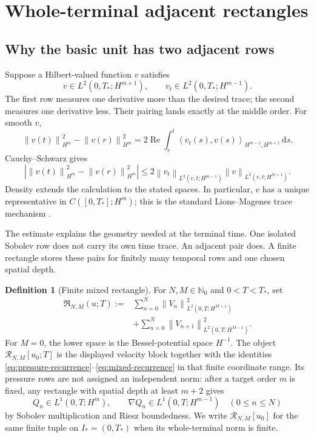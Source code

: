 \documentclass[11pt]{article}
\theoremstyle{definition}
\newtheorem{definition}[definition]{Definition}
\theoremstyle{remark}
\newcommand{\Nzero}{\mathbb N_0}
\newcommand{\cR}{\mathcal R}
\newcommand{\norm}[1]{\left\lVert #1\right\rVert}
\newcommand{\pair}[2]{\left\langle #1,#2\right\rangle}
\newcommand{\dd}{\,\mathrm d}
\begin{document}
\section{Whole-terminal adjacent rectangles}
\label{sec:rectangles}

\subsection{Why the basic unit has two adjacent rows}

Suppose a Hilbert-valued function \(v\) satisfies
\[
 v\in L^2(0,T_*;H^{m+1}),
 \qquad
 v_t\in L^2(0,T_*;H^{m-1}).
\]
The first row measures one derivative more than the desired trace; the second
measures one derivative less.  Their pairing lands exactly at the middle
order.  For smooth \(v\),
\begin{equation}
 \norm{v(t)}_{H^m}^2-\norm{v(r)}_{H^m}^2
 =2\operatorname{Re}\int_r^t
 \pair{v_t(s)}{v(s)}_{H^{m-1},H^{m+1}}\dd s.
 \label{eq:adjacent-identity}
\end{equation}
Cauchy--Schwarz gives
\begin{equation}
 \left|\norm{v(t)}_{H^m}^2-\norm{v(r)}_{H^m}^2\right|
 \leq
 2\norm{v_t}_{L^2(r,t;H^{m-1})}
   \norm{v}_{L^2(r,t;H^{m+1})}.
 \label{eq:adjacent-estimate}
\end{equation}
Density extends the calculation to the stated spaces.  In particular,
\(v\) has a unique representative in \(C([0,T_*];H^m)\); this is the
standard Lions--Magenes trace mechanism \cite{LionsMagenes}.

The estimate explains the geometry needed at the terminal time.  One isolated
Sobolev row does not carry its own time trace.  An adjacent pair does.  A
finite rectangle stores these pairs for finitely many temporal rows and one
chosen spatial depth.

\begin{definition}[Finite mixed rectangle]
\label{def:rectangle}
For \(N,M\in\Nzero\) and \(0<T<T_*\), set
\begin{equation}
\begin{aligned}
 \mathfrak R_{N,M}(u;T)
 :={}&\sum_{n=0}^{N}
 \norm{V_n}_{L^2(0,T;H^{M+1})}^2
 \\
 &+\sum_{n=0}^{N}
 \norm{V_{n+1}}_{L^2(0,T;H^{M-1})}^2.
\end{aligned}
\label{eq:rectangle-norm}
\end{equation}
For \(M=0\), the lower space is the Bessel-potential space \(H^{-1}\).
The object \(\cR_{N,M}[u_0;T]\) is the displayed velocity block together with
the identities \eqref{eq:pressure-recurrence}--\eqref{eq:mixed-recurrence} in
that finite coordinate range.  Its pressure rows are not assigned an
independent norm: after a target order \(m\) is fixed, any rectangle with
spatial depth at least \(m+2\) gives
\[
 Q_n\in L^1(0,T;H^m),
 \qquad \nabla Q_n\in L^1(0,T;H^{m-1})
 \quad(0\leq n\leq N)
\]
by Sobolev multiplication and Riesz boundedness.  We write
\(\cR_{N,M}[u_0]\) for the same finite tuple on \(I_*=(0,T_*)\) when its
whole-terminal norm is finite.
\end{definition}
\end{document}
